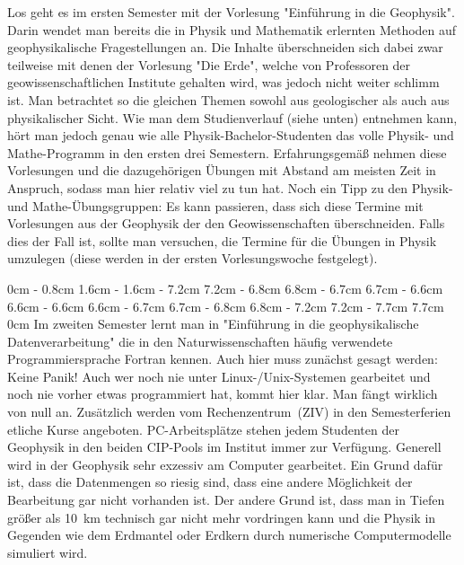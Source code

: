 \begin{multicols}{2}
Los geht es im ersten Semester mit der Vorlesung "Einführung in die Geophysik".
Darin wendet man bereits die in Physik und Mathematik erlernten Methoden auf geophysikalische Fragestellungen an.
Die Inhalte überschneiden sich dabei zwar teilweise mit denen der Vorlesung "Die Erde", welche von Professoren der geowissenschaftlichen Institute gehalten wird, was jedoch nicht weiter schlimm ist.
Man betrachtet so die gleichen Themen sowohl aus geologischer als auch aus physikalischer Sicht.
Wie man dem Studienverlauf (siehe unten) entnehmen kann, hört man jedoch genau wie alle Physik-Bachelor-Studenten das volle Physik- und Mathe-Programm in den ersten drei Semestern.
Erfahrungsgemäß nehmen diese Vorlesungen und die dazugehörigen Übungen mit Abstand am meisten Zeit in Anspruch, sodass man hier relativ viel zu tun hat.
Noch ein Tipp zu den Physik- und Mathe-Übungsgruppen: Es kann passieren, dass sich diese Termine mit Vorlesungen aus der Geophysik der den Geowissenschaften überschneiden.
Falls dies der Fall ist, sollte man versuchen, die Termine für die Übungen in Physik umzulegen (diese werden in der ersten Vorlesungswoche festgelegt).

{}
0cm \columnwidth
0cm \columnwidth
0cm \columnwidth
0cm \columnwidth
0cm \columnwidth
0cm \columnwidth
0cm \columnwidth
0cm \columnwidth
0.8cm \dimexpr\columnwidth - 0.8cm
1.6cm \dimexpr\columnwidth - 1.6cm
\dimexpr\columnwidth - 7.2cm 7.2cm
\dimexpr\columnwidth - 6.8cm 6.8cm
\dimexpr\columnwidth - 6.7cm 6.7cm
\dimexpr\columnwidth - 6.6cm 6.6cm
\dimexpr\columnwidth - 6.6cm 6.6cm
\dimexpr\columnwidth - 6.7cm 6.7cm
\dimexpr\columnwidth - 6.8cm 6.8cm
\dimexpr\columnwidth - 7.2cm 7.2cm
\dimexpr\columnwidth - 7.7cm 7.7cm
0cm \columnwidth
0cm \columnwidth
0cm \columnwidth
0cm \columnwidth
0cm \columnwidth
Im zweiten Semester lernt man in "Einführung in die geophysikalische Datenverarbeitung" die in den Naturwissenschaften häufig verwendete Programmiersprache Fortran kennen.
Auch hier muss zunächst gesagt werden: Keine Panik! Auch wer noch nie unter Linux-/Unix-Systemen gearbeitet und noch nie vorher etwas programmiert hat, kommt hier klar.
Man fängt wirklich von null an.
Zusätzlich werden vom Rechenzentrum~(ZIV) in den Semesterferien etliche Kurse angeboten.
PC-Arbeitsplätze stehen jedem Studenten der Geophysik in den beiden CIP-Pools im Institut immer zur Verfügung.
Generell wird in der Geophysik sehr exzessiv am Computer gearbeitet.
Ein Grund dafür ist, dass die Datenmengen so riesig sind, dass eine andere Möglichkeit der Bearbeitung gar nicht vorhanden ist.
Der andere Grund ist, dass man in Tiefen größer als \SI{10}{\km} technisch gar nicht mehr vordringen kann und die Physik in Gegenden wie dem Erdmantel oder Erdkern durch numerische Computermodelle simuliert wird.


\end{multicols}
